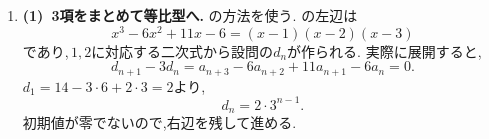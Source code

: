 \begin{enumerate}[label=\textbf{問\arabic*.},leftmargin=3.8em,format=\bookitemlink{practice-special}{solution}{problem}]
                \smallskip
                \textbf{(2)~を足して戻す.}
                $\displaystyle e_n=a_{n+1}-a_n$とおくと,
                \[
                  e_{n+1}-e_n=d_n=6n+6,
                \]
                かつ$\displaystyle e_1=9-2=7$である.したがって,
                \begin{align*}
                  e_n&=7+\sum_{k=1}^{n-1}(6k+6)\\
                     &=3n^2+3n+1.
                \end{align*}
                もう一度足せば,
                \begin{align*}
                  a_n&=2+\sum_{k=1}^{n-1}(3k^2+3k+1)\\
                     &=n^3+1.
                \end{align*}
                ここでは$\displaystyle n=1$の空の和を$\displaystyle 0$とする.
                初期値を$d_1,e_1,a_1$の順に使った.
                で次数を下げ,和で元へ戻す.
          \item \textbf{(1)~3項をまとめて等比型へ.}
                の方法を使う.
                の左辺は
                \[
                  x^3-6x^2+11x-6=(x-1)(x-2)(x-3)
                \]
                であり,\,$\displaystyle 1,2$に対応する二次式から設問の$\displaystyle d_n$が作られる.
                実際に展開すると,
                \[
                  d_{n+1}-3d_n
                    =a_{n+3}-6a_{n+2}+11a_{n+1}-6a_n=0.
                \]
                $\displaystyle d_1=14-3\cdot6+2\cdot3=2$より,
                \[
                  d_n=2\cdot3^{n-1}.
                \]
                初期値が零でないので,右辺を残して進める.


\end{enumerate}
